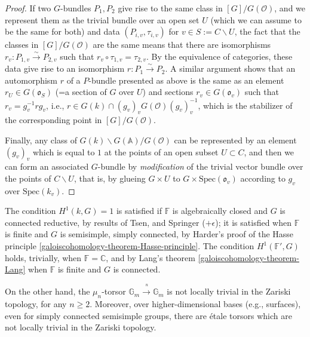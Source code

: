 \begin{proof}
If two $G$-bundles $P_1, P_2$ give rise to the same class in $[G]/G(\mathcal O)$, and we represent them as the trivial bundle over an open set $U$ (which we can assume to be the same for both) and data $(P_{i,v}, \tau_{i,v})$ for $v\in S:= C\smallsetminus U$, the fact that the classes in $[G]/G(\mathcal O)$ are the same means that there are isomorphisms $r_v: P_{1,v}\xrightarrow\sim P_{2,v}$ such that $r_v\circ \tau_{1,v} = \tau_{2,v}$. By the equivalence of categories, these data give rise to an isomorphism $r:P_1\xrightarrow\sim P_2$. A similar argument shows that an automorphism $r$ of a $P$-bundle presented as above is the same as an element $r_U \in G(\mathfrak o_S)$ (=a section of $G$ over $U$) and sections $r_v \in G(\mathfrak o_v)$ such that $r_v = g_v^{-1} r g_v$, i.e., $r\in G(k)\cap (g_v)_v G(\mathcal O) (g_v)_v^{-1}$, which is the stabilizer of the corresponding point in $[G]/G(\mathcal O)$.

Finally, any class of $G(k)\backslash G(\mathbb A)/G(\mathcal O)$ can be represented by an element $(g_v)_v$ which is equal to $1$ at the points of an open subset $U\subset C$, and then we can form an associated $G$-bundle by \emph{modification} of the trivial vector bundle over the points of $C\smallsetminus U$, that is, by glueing $G\times U$ to $G\times \text{Spec}(\mathfrak o_v)$ according to $g_v$ over $\text{Spec}(k_v)$. 
\end{proof}



\begin{remark}
\label{remark-vanishing-cohomology}
The condition $H^1(k,G)=1$ is satisfied if $\mathbb F$ is algebraically closed and $G$ is connected reductive, by results of Tsen, and Springer ($+\epsilon$); it is satisfied when $\mathbb F$ is finite and $G$ is semisimple, simply connected, by Harder's proof of the Hasse principle \ref{galoiscohomology-theorem-Hasse-principle}. The condition $H^1(\mathbb F',G)$ holds, trivially, when $\mathbb F = \mathbb C$, and by Lang's theorem \ref{galoiscohomology-theorem-Lang} when $\mathbb F$ is finite and $G$ is connected.

On the other hand, the $\mu_n$-torsor $\mathbb G_m\xrightarrow{~^n}\mathbb G_m$ is not locally trivial in the Zariski topology, for  any $n\ge 2$. Moreover, over higher-dimensional bases (e.g., surfaces), even for simply connected semisimple groups, there are \'etale torsors which are not locally trivial in the Zariski topology.
\end{remark}

